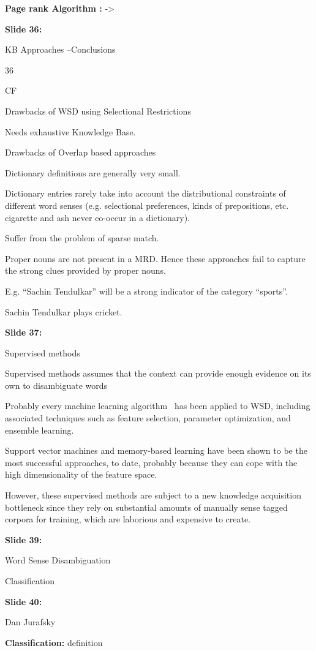 \documentclass[11pt,a4paper]{article}
\begin{document}
\textbf{Page rank Algorithm :} ->

\textbf{Slide 36:}

KB Approaches –Conclusions

36

CF

Drawbacks of WSD using Selectional Restrictions

Needs exhaustive Knowledge Base.

Drawbacks of Overlap based approaches

Dictionary definitions are generally very small.

Dictionary entries rarely take into account the distributional constraints  of different word senses (e.g. selectional preferences, kinds of  prepositions, etc.  cigarette and ash never co-occur in a dictionary).

Suffer from the problem of sparse match.

Proper nouns are not present in a MRD. Hence these approaches fail to  capture the strong clues provided by proper nouns.

E.g. “Sachin Tendulkar” will be a strong indicator of the category “sports”.

Sachin Tendulkar plays cricket.

\textbf{Slide 37:}

Supervised methods

Supervised methods assumes that the context can provide enough evidence on its own to disambiguate words

Probably every machine learning algorithm  has been applied to WSD, including associated techniques such as feature selection, parameter optimization, and ensemble learning.

Support vector machines and memory-based learning have been shown to be the most successful approaches, to date, probably because they can cope with the high dimensionality of the feature space.

However, these supervised methods are subject to a new knowledge acquisition bottleneck since they rely on substantial amounts of manually sense tagged corpora for training, which are laborious and expensive to create.

\textbf{Slide 39:}

Word Sense  Disambiguation

Classification

\textbf{Slide 40:}

Dan  Jurafsky

\textbf{Classification:}   definition
\end{document}
